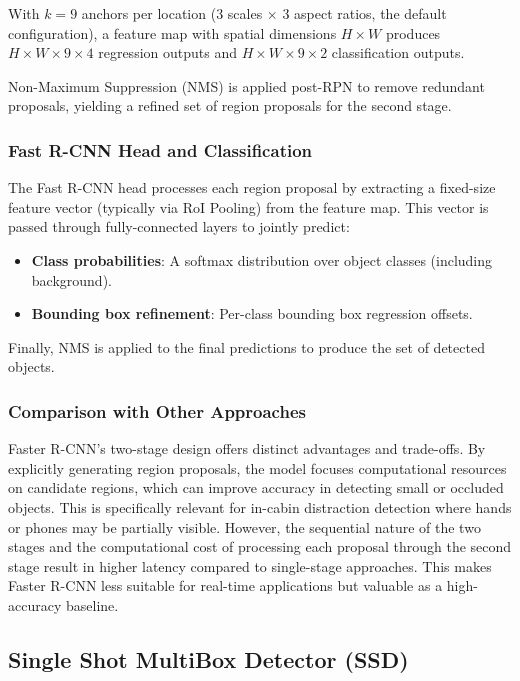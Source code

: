 \documentclass[conference]{IEEEtran}
\begin{document}
With $k=9$ anchors per location (3 scales $\times$ 3 aspect ratios, the default configuration), a feature map with spatial dimensions $H \times W$ produces $H \times W \times 9 \times 4$ regression outputs and $H \times W \times 9 \times 2$ classification outputs.

Non-Maximum Suppression (NMS) is applied post-RPN to remove redundant proposals, yielding a refined set of region proposals for the second stage.

\subsubsection{Fast R-CNN Head and Classification}

The Fast R-CNN head processes each region proposal by extracting a fixed-size feature vector (typically via RoI Pooling) from the feature map. This vector is passed through fully-connected layers to jointly predict:
\begin{itemize}
\item \textbf{Class probabilities}: A softmax distribution over object classes (including background).
\item \textbf{Bounding box refinement}: Per-class bounding box regression offsets.
\end{itemize}

Finally, NMS is applied to the final predictions to produce the set of detected objects.

\subsubsection{Comparison with Other Approaches}

Faster R-CNN's two-stage design offers distinct advantages and trade-offs. By explicitly generating region proposals, the model focuses computational resources on candidate regions, which can improve accuracy in detecting small or occluded objects. This is specifically relevant for in-cabin distraction detection where hands or phones may be partially visible. However, the sequential nature of the two stages and the computational cost of processing each proposal through the second stage result in higher latency compared to single-stage approaches. This makes Faster R-CNN less suitable for real-time applications but valuable as a high-accuracy baseline.

\subsection{Single Shot MultiBox Detector (SSD)}
\label{sec:ssd}
\end{document}
